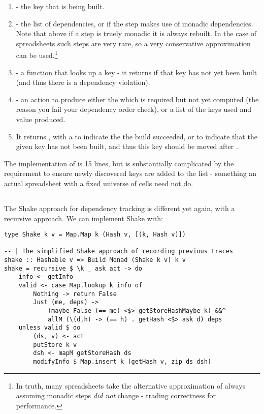 \begin{enumerate}
\item {} - the key that is being built.
\item {} - the list of dependencies, or  if the step makes use of monadic dependencies. Note that above if a step is truely monadic it is always rebuilt. In the case of spreadsheets such steps are very rare, so a very conservative approximation can be used.\footnote{In truth, many spreadsheets take the alternative approximation of always assuming monadic steps \textit{did not} change - trading correctness for performance.}
\item {} - a function that looks up a key - it returns  if that key has not yet been built (and thus there is a dependency violation).
\item {} - an action to produce either the  which is required but not yet computed (the reason you fail your dependency order check), or a list of the keys used and value produced.
\item It returns , with a  to indicate the the build succeeded, or  to indicate that the given key  has not been built, and thus this key should be moved after .
\end{enumerate}

The implementation of  is 15 lines, but is substantially complicated by the requirement to ensure newly discovered keys are added to the list - something an actual spreadsheet with a fixed universe of cells need not do.

\subsection{\Shake}\label{sec-implementation-shake}

The Shake approach for dependency tracking is different yet again, with a recursive approach. We can implement Shake with:

\begin{verbatim}
type Shake k v = Map.Map k (Hash v, [(k, Hash v)])

-- | The simplified Shake approach of recording previous traces
shake :: Hashable v => Build Monad (Shake k v) k v
shake = recursive $ \k _ ask act -> do
    info <- getInfo
    valid <- case Map.lookup k info of
        Nothing -> return False
        Just (me, deps) ->
            (maybe False (== me) <$> getStoreHashMaybe k) &&^
            allM (\(d,h) -> (== h) . getHash <$> ask d) deps
    unless valid $ do
        (ds, v) <- act
        putStore k v
        dsh <- mapM getStoreHash ds
        modifyInfo $ Map.insert k (getHash v, zip ds dsh)
\end{verbatim}

